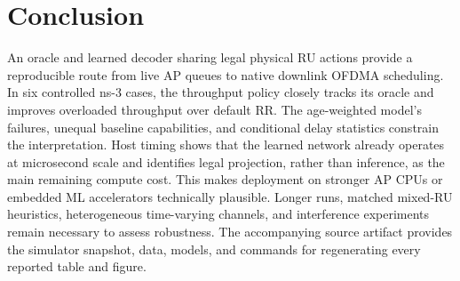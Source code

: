 \documentclass[lettersize,journal]{IEEEtran}
\begin{document}
\section{Conclusion}
An oracle and learned decoder sharing legal physical RU actions provide a
reproducible route from live AP queues to native downlink OFDMA scheduling.
In six controlled ns-3 cases, the throughput policy closely tracks its
oracle and improves overloaded throughput over default RR. The age-weighted
model's failures, unequal baseline capabilities, and conditional delay
statistics constrain the interpretation. Host timing shows that the learned network already operates at
microsecond scale and identifies legal projection, rather than inference, as
the main remaining compute cost. This makes deployment on stronger AP CPUs or
embedded ML accelerators technically plausible. Longer runs, matched mixed-RU
heuristics, heterogeneous time-varying channels, and interference experiments
remain necessary to assess robustness. The accompanying source artifact provides
the simulator snapshot, data, models, and commands for regenerating every
reported table and figure.



\end{document}
